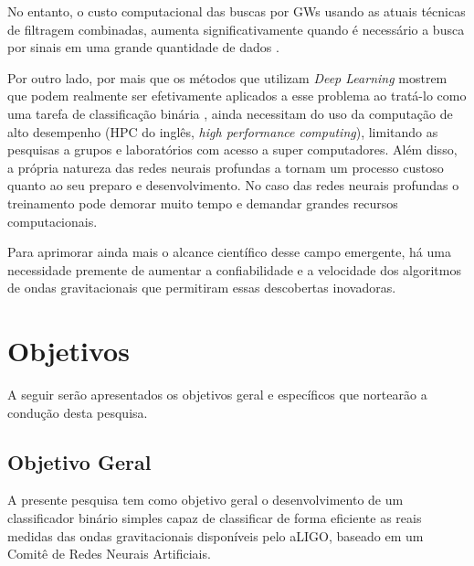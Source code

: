 No entanto, o custo computacional das buscas por GWs usando as atuais técnicas de filtragem combinadas, aumenta significativamente quando é necessário a busca por sinais em uma grande quantidade de dados \cite{abbott2018prospects}.

Por outro lado, por mais que os métodos que utilizam \textit{Deep Learning} mostrem que podem realmente ser efetivamente aplicados a esse problema ao tratá-lo como uma tarefa de classificação binária \cite{gebhard2019convolutional}, ainda necessitam do uso da computação de alto desempenho (HPC do inglês, \textit{high performance computing}), limitando as pesquisas a grupos e laboratórios com acesso a super computadores. Além disso, a própria natureza das redes neurais profundas a tornam um processo custoso quanto ao seu preparo e desenvolvimento. No caso das redes neurais profundas o treinamento pode demorar muito tempo e demandar grandes recursos computacionais.

Para aprimorar ainda mais o alcance científico desse campo emergente, há uma necessidade premente de aumentar a confiabilidade e a velocidade dos algoritmos de ondas gravitacionais que permitiram essas descobertas inovadoras.

\section{Objetivos}
A seguir serão apresentados os objetivos geral e específicos que nortearão a condução desta pesquisa.

\subsection{Objetivo Geral}

A presente pesquisa tem como objetivo geral o desenvolvimento de um classificador binário simples capaz de classificar de forma eficiente as reais medidas das ondas gravitacionais disponíveis pelo aLIGO, baseado em um Comitê de Redes Neurais Artificiais.


